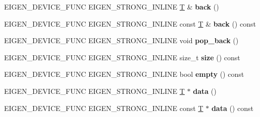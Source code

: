 \begin{DoxyCompactItemize}
E\+I\+G\+E\+N\+\_\+\+D\+E\+V\+I\+C\+E\+\_\+\+F\+U\+NC E\+I\+G\+E\+N\+\_\+\+S\+T\+R\+O\+N\+G\+\_\+\+I\+N\+L\+I\+NE \hyperlink{group___sparse_core___module}{T} \& {\bfseries back} ()
\item 
\mbox{\label{class_eigen_1_1_max_size_vector_a777e17e8969e9af6e3e8ad99432085f8}} 
E\+I\+G\+E\+N\+\_\+\+D\+E\+V\+I\+C\+E\+\_\+\+F\+U\+NC E\+I\+G\+E\+N\+\_\+\+S\+T\+R\+O\+N\+G\+\_\+\+I\+N\+L\+I\+NE const \hyperlink{group___sparse_core___module}{T} \& {\bfseries back} () const
\item 
\mbox{\label{class_eigen_1_1_max_size_vector_a40a240932d0f051167b3ab3c4d93c76b}} 
E\+I\+G\+E\+N\+\_\+\+D\+E\+V\+I\+C\+E\+\_\+\+F\+U\+NC E\+I\+G\+E\+N\+\_\+\+S\+T\+R\+O\+N\+G\+\_\+\+I\+N\+L\+I\+NE void {\bfseries pop\+\_\+back} ()
\item 
\mbox{\label{class_eigen_1_1_max_size_vector_a126c2ea17157a14348222e5cb6a276ca}} 
E\+I\+G\+E\+N\+\_\+\+D\+E\+V\+I\+C\+E\+\_\+\+F\+U\+NC E\+I\+G\+E\+N\+\_\+\+S\+T\+R\+O\+N\+G\+\_\+\+I\+N\+L\+I\+NE size\+\_\+t {\bfseries size} () const
\item 
\mbox{\label{class_eigen_1_1_max_size_vector_afe88367ec2ceb25dc34553875a619396}} 
E\+I\+G\+E\+N\+\_\+\+D\+E\+V\+I\+C\+E\+\_\+\+F\+U\+NC E\+I\+G\+E\+N\+\_\+\+S\+T\+R\+O\+N\+G\+\_\+\+I\+N\+L\+I\+NE bool {\bfseries empty} () const
\item 
\mbox{\label{class_eigen_1_1_max_size_vector_aaec47c5d1dd5aebc4203234a17f6eb4d}} 
E\+I\+G\+E\+N\+\_\+\+D\+E\+V\+I\+C\+E\+\_\+\+F\+U\+NC E\+I\+G\+E\+N\+\_\+\+S\+T\+R\+O\+N\+G\+\_\+\+I\+N\+L\+I\+NE \hyperlink{group___sparse_core___module}{T} $\ast$ {\bfseries data} ()
\item 
\mbox{\label{class_eigen_1_1_max_size_vector_afcfef523d67f0efe33d33e8dfeada3f4}} 
E\+I\+G\+E\+N\+\_\+\+D\+E\+V\+I\+C\+E\+\_\+\+F\+U\+NC E\+I\+G\+E\+N\+\_\+\+S\+T\+R\+O\+N\+G\+\_\+\+I\+N\+L\+I\+NE const \hyperlink{group___sparse_core___module}{T} $\ast$ {\bfseries data} () const
\item 
\mbox{\label{class_eigen_1_1_max_size_vector_aba5c7b789a2cb0395a6a8db0e451e915}} 

\end{DoxyCompactItemize}
